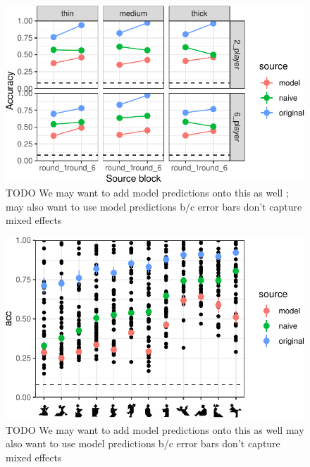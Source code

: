 \documentclass[10pt, letterpaper]{article}
\begin{document}
\begin{CodeChunk}
\begin{figure}[t]

{\centering \includegraphics[width=1\linewidth]{figs/fig-1-1} 

}

\caption[TODO We may want to add model predictions onto this as well ]{TODO We may want to add model predictions onto this as well ; may also want to use model predictions b/c error bars don't capture mixed effects \label{TODO}}\label{fig:fig-1}
\end{figure}
\end{CodeChunk}

\begin{CodeChunk}
\begin{figure}[t]

{\centering \includegraphics[width=1\linewidth]{figs/fig-2-1} 

}

\caption[TODO We may want to add model predictions onto this as well may also want to use model predictions b/c error bars don't capture mixed effects \label{TODO2}]{TODO We may want to add model predictions onto this as well may also want to use model predictions b/c error bars don't capture mixed effects \label{TODO2}}\label{fig:fig-2}
\end{figure}
\end{CodeChunk}
\end{document}
